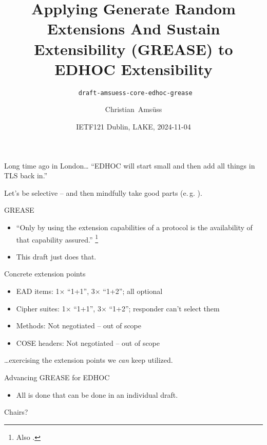 

\title[Applying GREASE to EDHOC]{Applying Generate Random Extensions And Sustain Extensibility (GREASE) to EDHOC Extensibility}
\subtitle{\texttt{ draft-amsuess-core-edhoc-grease}}
\author{Christian~Amsüss}
\date{IETF121 Dublin, LAKE, 2024-11-04}



\frame{\titlepage}

\begin{frame}{Long time ago in London\ldots}\Large
  ``EDHOC will start small and then add all things in TLS back in.''

  \bigskip

  Let's be selective -- and then mindfully take good parts (e.\,g. ).
\end{frame}

\begin{frame}{GREASE}\Large
  \begin{itemize}
    \item ``Only by using the extension capabilities of a protocol is the availability of that capability assured.'' \footnote{Also .}
    \item This draft just does that.
  \end{itemize}
\end{frame}

\begin{frame}{Concrete extension points}\Large
  \begin{itemize}
    \item[\ding{52}] EAD items: 1$\times$ ``1+1'', 3$\times$ ``1+2''; all optional
    \item[\ding{52}] Cipher suites: 1$\times$ ``1+1'', 3$\times$ ``1+2''; responder can't select them
    \item[\ding{54}] Methods: Not negotiated -- out of scope
    \item[\ding{54}] COSE headers: Not negotiated -- out of scope %
  \end{itemize}

  \bigskip

  \ldots exercising the extension points we \textit{can} keep utilized.
\end{frame}

\begin{frame}{Advancing GREASE for EDHOC}\Large
  \begin{itemize}
    \item All is done that can be done in an individual draft.
  \end{itemize}

  \vspace{2cm}
  \pause

  \raggedleft Chairs?
\end{frame}

